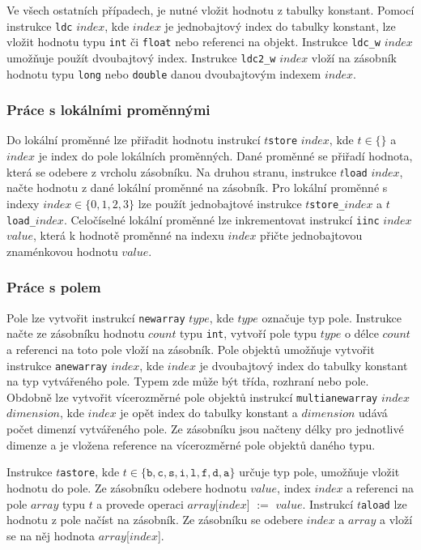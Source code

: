 Ve všech ostatních případech, je nutné vložit hodnotu z tabulky konstant. Pomocí instrukce \texttt{ldc} $index$, kde $index$ je jednobajtový index do tabulky konstant, lze vložit hodnotu typu \texttt{int} či \texttt{float} nebo referenci na objekt. Instrukce \texttt{ldc\_w} $index$ umožňuje použít dvoubajtový index. Instrukce \texttt{ldc2\_w} $index$ vloží na zásobník hodnotu typu \texttt{long} nebo \texttt{double} danou dvoubajtovým indexem  $index$.

\subsubsection{Práce s lokálními proměnnými}

Do lokální proměnné lze přiřadit hodnotu instrukcí $t$\texttt{store} $index$, kde $t \in \{  \}$ a $index$ je index do pole lokálních proměnných. Dané proměnné se přiřadí hodnota, která se odebere z vrcholu zásobníku. Na druhou stranu, instrukce $t$\texttt{load} $index$, načte hodnotu z dané lokální proměnné na zásobník. Pro lokální proměnné s indexy $index \in \{0,1,2,3\}$ lze použít jednobajtové instrukce $t$\texttt{store\_}$index$ a $t$\texttt{load\_}$index$.
Celočíselné lokální proměnné lze inkrementovat instrukcí \texttt{iinc} $index$ $value$, která k hodnotě proměnné na indexu $index$ přičte jednobajtovou znaménkovou hodnotu $value$.

\subsubsection{Práce s polem}

Pole lze vytvořit instrukcí \texttt{newarray} $type$, kde $type$ označuje typ pole. Instrukce načte ze zásobníku hodnotu $count$ typu \texttt{int}, vytvoří pole typu $type$ o délce $count$ a referenci na toto pole vloží na zásobník. Pole objektů umožňuje vytvořit instrukce \texttt{anewarray} $index$, kde $index$ je dvoubajtový index do tabulky konstant na typ vytvářeného pole. Typem zde může být třída, rozhraní nebo pole. Obdobně lze vytvořit vícerozměrné pole objektů instrukcí \texttt{multianewarray} $index$ $dimension$, kde $index$ je opět index do tabulky konstant a $dimension$ udává počet dimenzí vytvářeného pole. Ze zásobníku jsou načteny délky pro jednotlivé dimenze a je vložena reference na vícerozměrné pole objektů daného typu.

Instrukce $t$\texttt{astore}, kde $t \in \{\texttt{b}, \texttt{c}, \texttt{s}, \texttt{i}, \texttt{l}, \texttt{f},  \texttt{d}, \texttt{a}  \}$ určuje typ pole, umožňuje vložit hodnotu do pole. Ze zásobníku odebere hodnotu $value$, index $index$ a referenci na pole $array$ typu $t$ a provede operaci $array$[$index$] $:=$ $value$.
Instrukcí $t$\texttt{aload} lze hodnotu z pole načíst na zásobník. Ze zásobníku se odebere $index$ a $array$ a vloží se na něj hodnota $array$[$index$]. 

